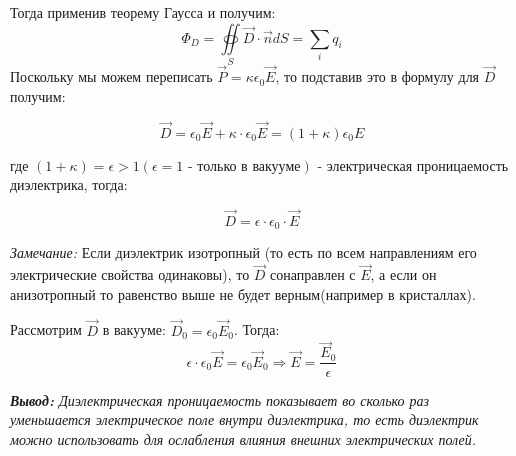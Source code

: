 \documentclass[../main.tex]{subfiles}
\begin{document}
Тогда применив теорему Гаусса и получим:
\[\Phi_D = \oiint\limits_S \vec D \cdot \vec n dS = \sum_{i} q_i\]
Поскольку мы можем переписать $\vec P = \kappa \epsilon_0 \vec E$, то подставив это в формулу для $\vec D$ получим:

\[\vec D = \epsilon_0 \vec E + \kappa \cdot \epsilon_0 \vec E = (1+\kappa)\epsilon_0 E\]
\begin{center}
    где $(1+\kappa) = \epsilon > 1 (\epsilon = 1 \text{ - только в вакууме})$ - электрическая проницаемость диэлектрика, тогда:
\end{center}

\[\vec D = \epsilon \cdot \epsilon_0 \cdot \vec E\]

\textit{Замечание:  }Если диэлектрик изотропный (то есть по всем направлениям его электрические свойства одинаковы), то $\vec D$ сонаправлен с $\vec E$, а если он анизотропный то равенство выше не будет верным(например в кристаллах).

\vspace{5px}

Рассмотрим $\vec D$ в вакууме: $\vec D_0 = \epsilon_0 \vec E_0$. Тогда:
\[\epsilon \cdot \epsilon_0 \vec E = \epsilon_0 \vec E_0 \Rightarrow \vec E = \frac{\vec E_0}{\epsilon}\]


\textit{\textbf{Вывод:} Диэлектрическая проницаемость показывает во сколько раз уменьшается электрическое поле внутри диэлектрика,
    то есть диэлектрик можно использовать для ослабления влияния внешних электрических полей.}
\end{document}
